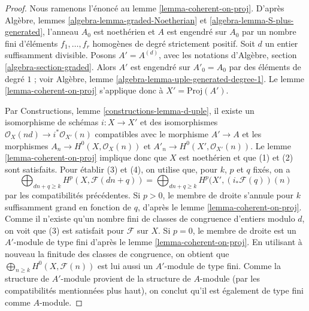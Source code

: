 \begin{proof}
Nous ramenons l'énoncé au
lemme \ref{lemma-coherent-on-proj}.
D'après Algèbre, lemmes \ref{algebra-lemma-graded-Noetherian} et
\ref{algebra-lemma-S-plus-generated}, l'anneau $A_0$ est noethérien
et $A$ est engendré sur $A_0$ par un nombre fini d'éléments
$f_1, \ldots, f_r$ homogènes de degré strictement positif.
Soit $d$ un entier suffisamment divisible. Posons $A' = A^{(d)}$, avec
les notations d'Algèbre, section \ref{algebra-section-graded}.
Alors $A'$ est engendré sur $A'_0 = A_0$ par des éléments de
degré $1$ ; voir Algèbre, lemme \ref{algebra-lemma-uple-generated-degree-1}.
Le lemme \ref{lemma-coherent-on-proj} s'applique donc à $X' = \text{Proj}(A')$.

\medskip\noindent
Par Constructions, lemme \ref{constructions-lemma-d-uple}, il
existe un isomorphisme de schémas $i : X \to X'$ et des
isomorphismes $\mathcal{O}_X(nd) \to i^*\mathcal{O}_{X'}(n)$
compatibles avec le morphisme $A' \to A$ et les morphismes
$A_n \to H^0(X, \mathcal{O}_X(n))$ et $A'_n \to H^0(X', \mathcal{O}_{X'}(n))$.
Le lemme \ref{lemma-coherent-on-proj} implique donc que $X$ est noethérien et que
(1) et (2) sont satisfaits. Pour établir (3)
et (4), on utilise que, pour $k$, $p$ et $q$ fixés, on a
$$
\bigoplus\nolimits_{dn + q \geq k} H^p(X, \mathcal{F}(dn + q)) =
\bigoplus\nolimits_{dn + q \geq k} H^p(X', (i_*\mathcal{F}(q))(n)
$$
par les compatibilités précédentes. Si $p > 0$, le membre de droite
s'annule pour $k$ suffisamment grand en fonction de $q$, d'après le
lemme \ref{lemma-coherent-on-proj}. Comme il n'existe qu'un nombre fini
de classes de congruence d'entiers modulo $d$, on voit que (3) est satisfait pour
$\mathcal{F}$ sur $X$. Si $p = 0$, le membre de droite
est un $A'$-module de type fini d'après le lemme \ref{lemma-coherent-on-proj}. En
utilisant à nouveau la finitude des classes de congruence, on obtient que
$\bigoplus_{n \geq k} H^0(X, \mathcal{F}(n))$ est lui aussi un $A'$-module de type fini.
Comme la structure de $A'$-module provient de la structure de $A$-module (par
les compatibilités mentionnées plus haut), on conclut qu'il est également de type
fini comme $A$-module.
\end{proof}

